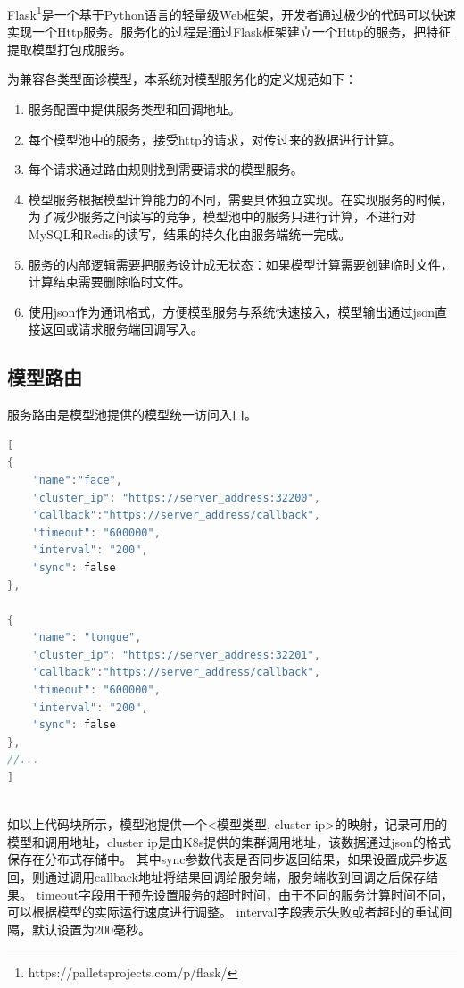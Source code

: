 Flask\footnote{https://palletsprojects.com/p/flask/}是一个基于Python语言的轻量级Web框架，开发者通过极少的代码可以快速实现一个Http服务。服务化的过程是通过Flask框架建立一个Http的服务，把特征提取模型打包成服务。

为兼容各类型面诊模型，本系统对模型服务化的定义规范如下：
\begin{enumerate}

    \item 服务配置中提供服务类型和回调地址。

    \item 每个模型池中的服务，接受http的请求，对传过来的数据进行计算。

    \item 每个请求通过路由规则找到需要请求的模型服务。

    \item 模型服务根据模型计算能力的不同，需要具体独立实现。在实现服务的时候，为了减少服务之间读写的竞争，模型池中的服务只进行计算，不进行对MySQL和Redis的读写，结果的持久化由服务端统一完成。

    \item 服务的内部逻辑需要把服务设计成无状态：如果模型计算需要创建临时文件，计算结束需要删除临时文件。

    \item 使用json作为通讯格式，方便模型服务与系统快速接入，模型输出通过json直接返回或请求服务端回调写入。
\end{enumerate}

\subsection{模型路由}

服务路由是模型池提供的模型统一访问入口。
\begin{lstlisting}[language={C}, title=模型统一访问入口, label={lst:service-json}, basicstyle=\normalsize]
[
{
    "name":"face",
    "cluster_ip": "https://server_address:32200",
    "callback":"https://server_address/callback",
    "timeout": "600000",
    "interval": "200",
    "sync": false
}, 

{
    "name": "tongue",
    "cluster_ip": "https://server_address:32201",
    "callback":"https://server_address/callback",
    "timeout": "600000",
    "interval": "200",
    "sync": false
},
//...
]
    
\end{lstlisting}

如以上代码块所示，模型池提供一个<模型类型, cluster ip>的映射，记录可用的模型和调用地址，cluster ip是由K8s提供的集群调用地址，该数据通过json的格式保存在分布式存储中。
其中sync参数代表是否同步返回结果，如果设置成异步返回，则通过调用callback地址将结果回调给服务端，服务端收到回调之后保存结果。
timeout字段用于预先设置服务的超时时间，由于不同的服务计算时间不同，可以根据模型的实际运行速度进行调整。
interval字段表示失败或者超时的重试间隔，默认设置为200毫秒。

